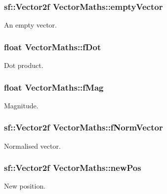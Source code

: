 \subsubsection[{\texorpdfstring{empty\+Vector}{emptyVector}}]{\setlength{\rightskip}{0pt plus 5cm}sf\+::\+Vector2f Vector\+Maths\+::empty\+Vector\hspace{0.3cm}{\ttfamily [private]}}\hypertarget{class_vector_maths_a701ff35f136062ae5e43b76e5f39c3e3}{}\label{class_vector_maths_a701ff35f136062ae5e43b76e5f39c3e3}
An empty vector. 
\subsubsection[{\texorpdfstring{f\+Dot}{fDot}}]{\setlength{\rightskip}{0pt plus 5cm}float Vector\+Maths\+::f\+Dot\hspace{0.3cm}{\ttfamily [private]}}\hypertarget{class_vector_maths_a1f152ea5bd11ef07643bea0de8d2a75c}{}\label{class_vector_maths_a1f152ea5bd11ef07643bea0de8d2a75c}
Dot product. 
\subsubsection[{\texorpdfstring{f\+Mag}{fMag}}]{\setlength{\rightskip}{0pt plus 5cm}float Vector\+Maths\+::f\+Mag\hspace{0.3cm}{\ttfamily [private]}}\hypertarget{class_vector_maths_a500410fcab46699e06a8b7dadf56771d}{}\label{class_vector_maths_a500410fcab46699e06a8b7dadf56771d}
Magnitude. 
\subsubsection[{\texorpdfstring{f\+Norm\+Vector}{fNormVector}}]{\setlength{\rightskip}{0pt plus 5cm}sf\+::\+Vector2f Vector\+Maths\+::f\+Norm\+Vector\hspace{0.3cm}{\ttfamily [private]}}\hypertarget{class_vector_maths_a28a7d7f8fc60f6c0b35e7896a5ec48d5}{}\label{class_vector_maths_a28a7d7f8fc60f6c0b35e7896a5ec48d5}
Normalised vector. 
\subsubsection[{\texorpdfstring{new\+Pos}{newPos}}]{\setlength{\rightskip}{0pt plus 5cm}sf\+::\+Vector2f Vector\+Maths\+::new\+Pos\hspace{0.3cm}{\ttfamily [private]}}\hypertarget{class_vector_maths_abc596252a016b278d89649aa84a788f6}{}\label{class_vector_maths_abc596252a016b278d89649aa84a788f6}
New position. 
